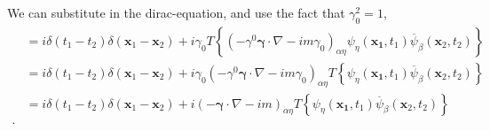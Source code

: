 \documentclass[working, oneside]{../../../Preambles/tuftebook}
\begin{document}
\begin{solution}
We can substitute in the dirac-equation, and use the fact that $\gamma_0^2 = 1$,
\begin{align*}
&= i \delta(t_1 - t_2) \delta(\mathbf{x}_1 - \mathbf{x}_2)+ i\gamma_0T \left\{ \left( - \gamma^0 \boldsymbol{\gamma} \cdot \nabla - i m \gamma_0 \right)_{\alpha \eta } \psi_\eta (\mathbf{x_1}, t_1) \overline{\psi}_\beta(\mathbf{x}_2, t_2) \right\} \\
&= i \delta(t_1 - t_2) \delta(\mathbf{x}_1 - \mathbf{x}_2)+ i\gamma_0 \left( - \gamma^0 \boldsymbol{\gamma} \cdot \nabla - i m \gamma_0 \right)_{\alpha \eta }T\left\{  \psi_\eta (\mathbf{x_1}, t_1) \overline{\psi}_\beta(\mathbf{x}_2, t_2) \right\} \\
&= i \delta(t_1 - t_2) \delta(\mathbf{x}_1 - \mathbf{x}_2)+ i \left( - \boldsymbol{\gamma} \cdot \nabla - i m  \right)_{\alpha \eta }T\left\{  \psi_\eta (\mathbf{x_1}, t_1) \overline{\psi}_\beta(\mathbf{x}_2, t_2) \right\} \\
.\end{align*}
\end{solution}
\end{document}
